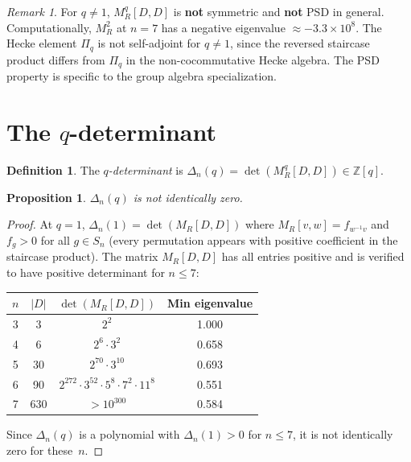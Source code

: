 \documentclass[11pt]{article}
\newtheorem{proposition}[theorem]{Proposition}
\theoremstyle{definition}
\newtheorem{definition}[theorem]{Definition}
\theoremstyle{remark}
\newtheorem{remark}[theorem]{Remark}
\begin{document}
\begin{remark}
For $q \neq 1$, $M_R^q[D,D]$ is \textbf{not} symmetric and
\textbf{not} PSD in general.  Computationally, $M_R^2$ at $n = 7$
has a negative eigenvalue $\approx -3.3 \times 10^8$.
The Hecke element $\Pi_q$ is not self-adjoint for $q \neq 1$,
since the reversed staircase product differs from $\Pi_q$ in
the non-cocommutative Hecke algebra.
The PSD property is specific to the group algebra specialization.
\end{remark}

\section{The $q$-determinant}

\begin{definition}
The \emph{$q$-determinant} is $\Delta_n(q) = \det(M_R^q[D,D])
\in \mathbb{Z}[q]$.
\end{definition}

\begin{proposition}\label{prop:nonzero}
$\Delta_n(q)$ is not identically zero.
\end{proposition}

\begin{proof}
At $q = 1$, $\Delta_n(1) = \det(M_R[D,D])$ where $M_R[v,w] =
f_{w^{-1}v}$ and $f_g > 0$ for all $g \in S_n$ (every permutation
appears with positive coefficient in the staircase product).
The matrix $M_R[D,D]$ has all entries positive and is verified to
have positive determinant for $n \leq 7$:

\medskip
\begin{center}
\begin{tabular}{cccc}
\toprule
$n$ & $|D|$ & $\det(M_R[D,D])$ & Min eigenvalue \\
\midrule
3 & 3 & $2^2$ & 1.000 \\
4 & 6 & $2^6 \cdot 3^2$ & 0.658 \\
5 & 30 & $2^{70} \cdot 3^{10}$ & 0.693 \\
6 & 90 & $2^{272} \cdot 3^{52} \cdot 5^8 \cdot 7^2 \cdot 11^8$ & 0.551 \\
7 & 630 & $> 10^{300}$ & 0.584 \\
\bottomrule
\end{tabular}
\end{center}
\medskip

\noindent Since $\Delta_n(q)$ is a polynomial with $\Delta_n(1) > 0$
for $n \leq 7$, it is not identically zero for these~$n$.
\end{proof}
\end{document}
